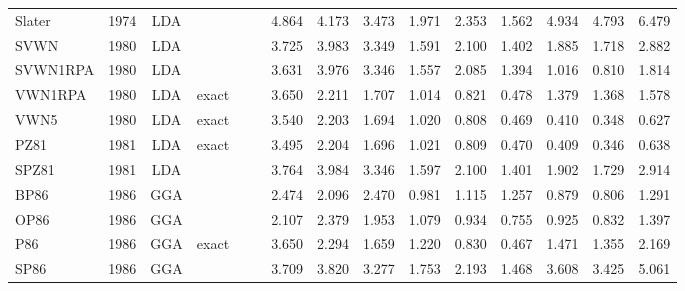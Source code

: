 \begin{landscape}
\begin{longtable}{lcccccrrrrrrrrr}
    Slater           & 1974 & LDA  &          &             &           & 4.864             & 4.173             & 3.473  & 1.971              & 2.353             & 1.562  & 4.934   & 4.793 & 6.479 \\
    SVWN             & 1980 & LDA  &          &             &           & 3.725             & 3.983             & 3.349  & 1.591              & 2.100             & 1.402  & 1.885   & 1.718 & 2.882 \\
    SVWN1RPA         & 1980 & LDA  &          &             &           & 3.631             & 3.976             & 3.346  & 1.557              & 2.085             & 1.394  & 1.016   & 0.810 & 1.814 \\
    VWN1RPA          & 1980 & LDA  & exact    &             &           & 3.650             & 2.211             & 1.707  & 1.014              & 0.821             & 0.478  & 1.379   & 1.368 & 1.578 \\
    VWN5             & 1980 & LDA  & exact    &             &           & 3.540             & 2.203             & 1.694  & 1.020              & 0.808             & 0.469  & 0.410   & 0.348 & 0.627 \\
    PZ81             & 1981 & LDA  & exact    &             &           & 3.495             & 2.204             & 1.696  & 1.021              & 0.809             & 0.470  & 0.409   & 0.346 & 0.638 \\
    SPZ81            & 1981 & LDA  &          &             &           & 3.764             & 3.984             & 3.346  & 1.597              & 2.100             & 1.401  & 1.902   & 1.729 & 2.914 \\
    BP86             & 1986 & GGA  &          &             &           & 2.474             & 2.096             & 2.470  & 0.981              & 1.115             & 1.257  & 0.879   & 0.806 & 1.291 \\
    OP86             & 1986 & GGA  &          &             &           & 2.107             & 2.379             & 1.953  & 1.079              & 0.934             & 0.755  & 0.925   & 0.832 & 1.397 \\
    P86              & 1986 & GGA  & exact    &             &           & 3.650             & 2.294             & 1.659  & 1.220              & 0.830             & 0.467  & 1.471   & 1.355 & 2.169 \\
    SP86             & 1986 & GGA  &          &             &           & 3.709             & 3.820             & 3.277  & 1.753              & 2.193             & 1.468  & 3.608   & 3.425 & 5.061 \\

\end{longtable}
\end{landscape}
